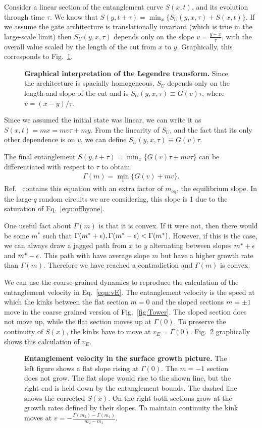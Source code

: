 Consider a linear section of the entanglement curve $S(x,t)$, and its evolution through time $\tau$. We know that $S(y,t+\tau) = \min_x\{S_U(y,x,\tau) + S(x,t)\}$. If we assume the gate architecture is translationally invariant (which is true in the large-scale limit) then $S_U(y,x,\tau)$ depends only on the slope $v = \frac{y-x}{\tau}$, with the overall value scaled by the length of the cut from $x$ to $y$. Graphically, this corresponds to Fig.~\ref{fig:legendre}.
\begin{figure}
	\centering
	
	\caption{\textbf{Graphical interpretation of the Legendre transform.} Since the architecture is spacially homogeneous, $S_U$ depends only on the length and slope of the cut and is $S_U(y,x,\tau) \equiv G(v)\tau$, where $v=(x-y)/\tau$.}
	\label{fig:legendre}
\end{figure}
Since we assumed the initial state was linear, we can write it as $S(x,t) = mx = mv\tau+my$. From the linearity of $S_U$, and the fact that its only other dependence is on $v$, we can define $S_U(y,x,\tau) \equiv G(v)\tau$. 

The final entanglement $S(y,t+\tau) = \min_x\{G(v)\tau + mv\tau\}$ can be differentiated with respect to $\tau$ to obtain.
\begin{align}
\Gamma(m) = \min_v\{G(v) + mv\}.
\end{align}
Ref.~\cite{Jonay18} contains this equation with an extra factor of $m_\text{eq}$, the equilibrium slope. In the large-$q$ random circuits we are considering, this slope is 1 due to the saturation of Eq.~\ref{eqn:offbyone}.

One useful fact about $\Gamma(m)$ is that it is convex. If it were not, then there would be some $m^*$ such that $\Gamma(m^*+\epsilon), \Gamma(m^*-\epsilon)<\Gamma(m^*)$. However, if this is the case, we can always draw a jagged path from $x$ to $y$ alternating between slopes $m^*+\epsilon$ and $m^*-\epsilon$. This path with have average slope $m$ but have a higher growth rate than $\Gamma(m)$. Therefore we have reached a contradiction and $\Gamma(m)$ is convex.

We can use the coarse-grained dynamics to reproduce the calculation of the entanglement velocity in Eq.~\ref{eqn:vE}. The entanglement velocity is the speed at which the kinks between the flat section $m=0$ and the sloped sections $m=\pm1$ move in the coarse grained version of Fig.~\ref{fig:Tower}. The sloped section does not move up, while the flat section moves up at $\Gamma(0)$. To preserve the continuity of $S(x)$, the kinks have to move at $v_E=\Gamma(0)$. Fig.~\ref{fig:entanglevel} graphically shows this calculation of $v_E$.
\begin{figure}
	\centering
	
	\caption{\textbf{Entanglement velocity in the surface growth picture.} The left figure shows a flat slope rising at $\Gamma(0)$. The $m=-1$ section does not grow. The flat slope would rise to the shown line, but the right end is held down by the entanglement bounds. The dashed line shows the corrected $S(x)$. On the right both sections grow at the growth rates defined by their slopes. To maintain continuity the kink moves at $v=-\frac{\Gamma(m_2)-\Gamma(m_1)}{m_2-m_1}$.}
	\label{fig:entanglevel}
\end{figure}


